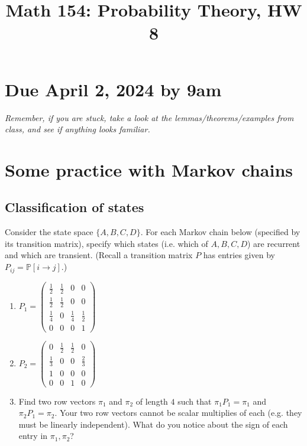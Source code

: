 \documentclass[12pt,reqno]{amsart}
\title{\Large Math 154: Probability Theory, HW 8\vspace{-0.1cm}}
\theoremstyle{definition}
\theoremstyle{remark}
\numberwithin{equation}{section}
\newenvironment{nouppercase}{%
  \let\uppercase\relax%
  \renewcommand{\uppercasenonmath}[1]{}}{}
\begin{document}
\begin{nouppercase}
\maketitle
\end{nouppercase}
\section*{Due April 2, 2024 by 9am}
\emph{Remember, if you are stuck, take a look at the lemmas/theorems/examples from class, and see if anything looks familiar.}
\section{Some practice with Markov chains}
\subsection{Classification of states}\label{subsection:classification}
Consider the state space $\{A,B,C,D\}$. For each Markov chain below (specified by its transition matrix), specify which states (i.e. which of $A,B,C,D$) are recurrent and which are transient. (Recall a transition matrix $P$ has entries given by $P_{ij}=\mathbb{P}[i\to j]$.)
\begin{enumerate}
\item $P_{1}=\begin{pmatrix}\frac12&\frac12&0&0\\\frac12&\frac12&0&0\\\frac14&0&\frac14&\frac12\\0&0&0&1\end{pmatrix}$\\
\item $P_{2}=\begin{pmatrix}0&\frac12&\frac12&0\\\frac13&0&0&\frac23\\1&0&0&0\\0&0&1&0\end{pmatrix}$
\item Find two row vectors $\pi_{1}$ and $\pi_{2}$ of length $4$ such that $\pi_{1}P_{1}=\pi_{1}$ and $\pi_{2}P_{1}=\pi_{2}$. Your two row vectors cannot be scalar multiplies of each (e.g. they must be linearly independent). What do you notice about the sign of each entry in $\pi_{1},\pi_{2}$?
\end{enumerate}
\end{document}
